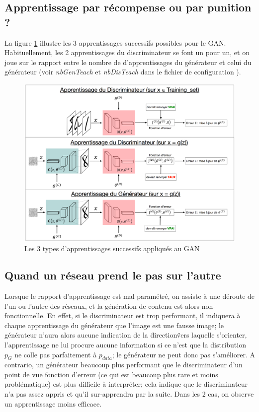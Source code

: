 \subsection{Apprentissage par récompense ou par punition ?}
\label{subsect:Appr}
La figure \ref{type-appr-GAN} illustre les 3 apprentissages successifs possibles pour le GAN. Habituellement, les 2 apprentissages du discriminateur se font un pour un, et on joue sur le rapport entre le nombre de d'apprentissages du générateur et celui du générateur (voir \textit{nbGenTeach} et \textit{nbDisTeach} dans le fichier de configuration \cite{barrios_gan_2018}). 
\begin{figure}[!h]
\begin{center}
\includegraphics[width=1\textwidth]{images/Colloque/GAN/apprentissage.png}
\caption{Les 3 types d'apprentissages successifs appliqués au GAN}
\label{type-appr-GAN}
\end{center}
\end{figure} 
\subsection{Quand un réseau prend le pas sur l'autre}
Lorsque le rapport d'apprentissage est mal paramétré, on assiste à une déroute de l'un ou l'autre des réseaux, et la génération de contenu est alors non-fonctionnelle. En effet, si le discriminateur est trop performant, il indiquera à chaque apprentissage du générateur que l'image est une fausse image; le générateur n'aura alors aucune indication de la \"direction\" vers laquelle s'orienter, l'apprentissage ne lui procure aucune information si ce n'est que la distribution $p_{G}$ ne colle pas parfaitement à $p_{data}$; le générateur ne peut donc pas s'améliorer.
A contrario, un générateur beaucoup plus performant que le discriminateur d'un point de vue fonction d'erreur (ce qui est beaucoup plus rare et moins problématique) est plus difficile à interpréter; cela indique que le discriminateur n'a pas assez appris et qu'il sur-apprendra par la suite. Dans les 2 cas, on observe un apprentissage moins efficace.





